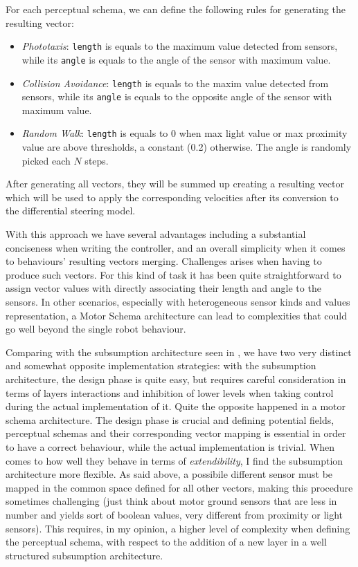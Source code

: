 For each perceptual schema, we can define the following rules for generating
the resulting vector:
\begin{itemize}
	\item \emph{Phototaxis}: \texttt{length} is equals to the maximum value detected
	      from sensors, while its \texttt{angle} is equals to the angle of the
	      sensor with maximum value.

	\item \emph{Collision Avoidance}: \texttt{length} is equals to the maxim
	      value detected from sensors, while its \texttt{angle} is equals to the
	      opposite angle of the sensor with maximum value.

	\item \emph{Random Walk}: \texttt{length} is equals to 0 when max light value
	      or max proximity value are above thresholds, a constant (0.2) otherwise.
	      The angle is randomly picked each $N$ steps.
\end{itemize}

After generating all vectors, they will be summed up creating a resulting vector
which will be used to apply the corresponding velocities after its conversion
to the differential steering model.

With this approach we have several advantages including a substantial
conciseness when writing the controller, and an overall simplicity when it
comes to behaviours' resulting vectors merging. Challenges arises when having
to produce such vectors. For this kind of task it has been quite
straightforward to assign vector values with directly associating their length
and angle to the sensors. In other scenarios, especially with heterogeneous
sensor kinds and values representation, a Motor Schema architecture can lead to
complexities that could go well beyond the single robot behaviour.

Comparing with the subsumption architecture seen in , we have
two very distinct and somewhat opposite implementation strategies: with the
subsumption architecture, the design phase is quite easy, but requires careful
consideration in terms of layers interactions and inhibition of lower levels
when taking control during the actual implementation of it. Quite the opposite
happened in a motor schema architecture. The design phase is crucial and
defining potential fields, perceptual schemas and their corresponding vector
mapping is essential in order to have a correct behaviour, while the actual
implementation is trivial. When comes to how well they behave in terms of
\emph{extendibility}, I find the subsumption architecture more flexible. As
said above, a possibile different sensor must be mapped in the common space
defined for all other vectors, making this procedure sometimes challenging
(just think about motor ground sensors that are less in number and yields sort
of boolean values, very different from proximity or light sensors). This
requires, in my opinion, a higher level of complexity when defining the
perceptual schema, with respect to the addition of a new layer in a well
structured subsumption architecture.

